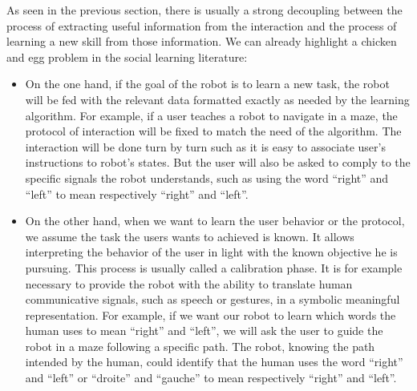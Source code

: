 
As seen in the previous section, there is usually a strong decoupling between the process of extracting useful information from the interaction and the process of learning a new skill from those information. We can already highlight a chicken and egg problem in the social learning literature:

\begin{itemize}

\item On the one hand, if the goal of the robot is to learn a new task, the robot will be fed with the relevant data formatted exactly as needed by the learning algorithm. For example, if a user teaches a robot to navigate in a maze, the protocol of interaction will be fixed to match the need of the algorithm. The interaction will be done turn by turn such as it is easy to associate user's instructions to robot's states. But the user will also be asked to comply to the specific signals the robot understands, such as using the word ``right'' and ``left'' to mean respectively ``right'' and ``left''.

\item On the other hand, when we want to learn the user behavior or the protocol, we assume the task the users wants to achieved is known. It allows interpreting the behavior of the user in light with the known objective he is pursuing. This process is usually called a calibration phase. It is for example necessary to provide the robot with the ability to translate human communicative signals, such as speech or gestures, in a symbolic meaningful representation. For example, if we want our robot to learn which words the human uses to mean ``right'' and ``left'', we will ask the user to guide the robot in a maze following a specific path. The robot, knowing the path intended by the human, could identify that the human uses the word ``right'' and ``left'' or ``droite'' and ``gauche'' to mean respectively ``right'' and ``left''.

\end{itemize}

